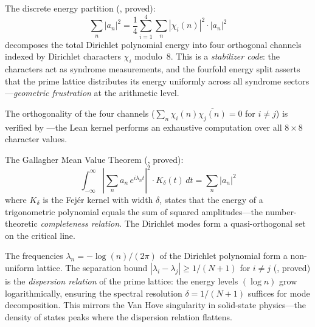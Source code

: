 \begin{correspondence}
The discrete energy partition (, proved):
\[
  \sum_n |a_n|^2 = \frac{1}{4}\sum_{i=1}^{4}
  \sum_{n} |\chi_i(n)|^2 \cdot |a_n|^2
\]
decomposes the total Dirichlet polynomial energy into four orthogonal
channels indexed by Dirichlet characters $\chi_i$ modulo~8. This is a
\emph{stabilizer code}: the characters act as syndrome measurements,
and the fourfold energy split asserts that the prime lattice distributes
its energy uniformly across all syndrome sectors---\emph{geometric
frustration} at the arithmetic level.

The orthogonality of the four channels ($\sum_n \chi_i(n)\overline{\chi_j(n)}
= 0$ for $i \neq j$) is verified by ---the Lean kernel
performs an exhaustive computation over all $8 \times 8$ character values.
\end{correspondence}

\begin{correspondence}
The Gallagher Mean Value Theorem (, proved):
\[
  \int_{-\infty}^{\infty} \left|\sum_n a_n\, e^{i\lambda_n t}\right|^2
  \cdot K_\delta(t)\,dt = \sum_n |a_n|^2
\]
where $K_\delta$ is the Fej\'er kernel with width $\delta$, states that
the energy of a trigonometric polynomial equals the sum of squared
amplitudes---the number-theoretic \emph{completeness relation}. The
Dirichlet modes form a quasi-orthogonal set on the critical line.
\end{correspondence}

\begin{correspondence}
The frequencies $\lambda_n = -\log(n)/(2\pi)$ of the Dirichlet
polynomial form a non-uniform lattice. The separation bound
$|\lambda_i - \lambda_j| \geq 1/(N+1)$ for $i \neq j$
(, proved) is the
\emph{dispersion relation} of the prime lattice: the energy levels
$(\log n)$ grow logarithmically, ensuring the spectral resolution
$\delta = 1/(N+1)$ suffices for mode decomposition. This mirrors
the Van Hove singularity in solid-state physics---the density of
states peaks where the dispersion relation flattens.
\end{correspondence}

